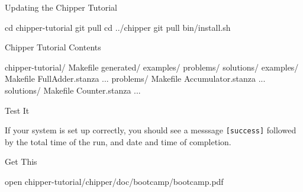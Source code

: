 \documentclass[xcolor=pdflatex,dvipsnames,table]{beamer}
\begin{document}
\begin{frame}[fragile]{Updating the Chipper Tutorial}

\begin{stanza}
cd chipper-tutorial
git pull
cd ../chipper
git pull
bin/install.sh
\end{stanza}
\end{frame}

\begin{frame}[fragile]{Chipper Tutorial Contents}
\begin{FramedSemiVerb}
chipper-tutorial/  
  Makefile
  generated/
    examples/
    problems/
    solutions/
  examples/   
    Makefile  
    FullAdder.stanza ...
  problems/   
    Makefile
    Accumulator.stanza ...
  solutions/  
    Makefile
    Counter.stanza ...
\end{FramedSemiVerb}
\end{frame}

\begin{frame}[fragile]{Test It}



\vspace{1cm}
\noindent
If your system is set up correctly, you should see a messsage \verb+[success]+ followed by the total time of the run, and date and time of completion. 

\end{frame}


\begin{frame}[fragile]{Get This}

\begin{bash}
open chipper-tutorial/chipper/doc/bootcamp/bootcamp.pdf
\end{bash}

\end{frame}
\end{document}
